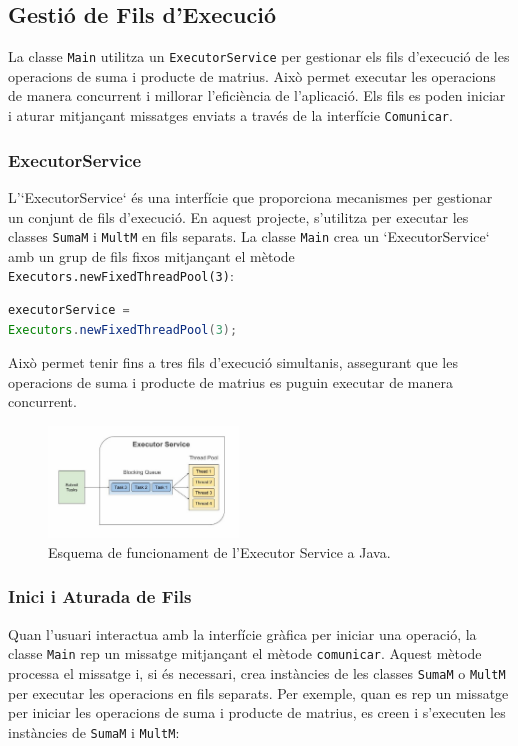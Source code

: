 \documentclass{ieeetj}
\begin{document}
\subsection{Gestió de Fils d'Execució}
La classe \texttt{Main} utilitza un \texttt{ExecutorService} per gestionar els fils d'execució de les operacions de suma i producte de matrius. Això permet executar les operacions de manera concurrent i millorar l'eficiència de l'aplicació. Els fils es poden iniciar i aturar mitjançant missatges enviats a través de la interfície \texttt{Comunicar}.

\subsubsection{ExecutorService}
L'`ExecutorService` és una interfície que proporciona mecanismes per gestionar un conjunt de fils d'execució. En aquest projecte, s'utilitza per executar les classes \texttt{SumaM} i \texttt{MultM} en fils separats. La classe \texttt{Main} crea un `ExecutorService` amb un grup de fils fixos mitjançant el mètode \texttt{Executors.newFixedThreadPool(3)}:

\begin{lstlisting}[language=Java, basicstyle=\ttfamily\normalsize]
executorService = 
Executors.newFixedThreadPool(3);
\end{lstlisting}

Això permet tenir fins a tres fils d'execució simultanis, assegurant que les operacions de suma i producte de matrius es puguin executar de manera concurrent.

\begin{figure}[htbp]
\centerline{\includegraphics[width=0.45\textwidth]{Cap1Matrius/docs/png/executorService.png}}
\caption{Esquema de funcionament de l'Executor Service a Java.}
\label{fig:exeServ}
\end{figure}

\subsubsection{Inici i Aturada de Fils}
Quan l'usuari interactua amb la interfície gràfica per iniciar una operació, la classe \texttt{Main} rep un missatge mitjançant el mètode \texttt{comunicar}. Aquest mètode processa el missatge i, si és necessari, crea instàncies de les classes \texttt{SumaM} o \texttt{MultM} per executar les operacions en fils separats. Per exemple, quan es rep un missatge per iniciar les operacions de suma i producte de matrius, es creen i s'executen les instàncies de \texttt{SumaM} i \texttt{MultM}:
\end{document}
